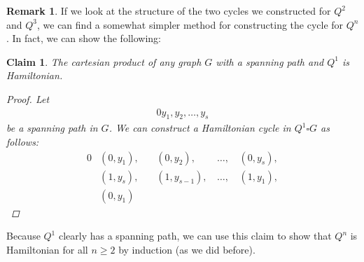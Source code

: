 \documentclass{amsart}
\theoremstyle{plain}
\newtheorem*{claim}{\textbf{Claim}}
\theoremstyle{definition}
\newtheorem*{rk}{\textbf{Remark}}
\begin{document}
    \begin{rk}
        If we look at the structure of the two cycles we constructed for $Q^2$ and $Q^3$,
        we can find a somewhat simpler method for constructing the cycle for $Q^n$.
        In fact, we can show the following:
        \begin{claim}
            The cartesian product of any graph $G$ with a spanning path and $Q^1$ is Hamiltonian.
            \begin{proof}
                Let
                \begin{alignat*}{0}
                    y_1, y_2, \ldots, y_s
                \end{alignat*}
                be a spanning path in $G$.
                We can construct a Hamiltonian cycle in $Q^1 \square G$ as follows:
                \begin{alignat*}{0}
                    & (0, y_1),\, && (0, y_2),\, & \ldots,\, & (0, y_s), \\
                    & (1, y_s),\, && (1, y_{s-1}),\, & \ldots,\, & (1, y_1),\\
                    & (0, y_1) &&&&
                \end{alignat*}
            \end{proof}
        \end{claim}
    \noindent Because $Q^1$ clearly has a spanning path, we can use this claim to show that $Q^n$ is Hamiltonian for all $n \geq 2$ by induction (as we did before).
    \end{rk}
\end{document}
